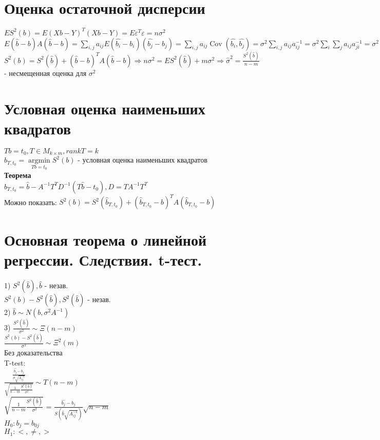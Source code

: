 \documentclass{article}
\newcommand\0{\mathbb{0}}
\DeclareMathOperator{\Cov}{Cov}
\DeclareMathOperator{\argmin}{argmin}
\newcommand\1{\mathbb{1}}
\renewcommand{\bf}{\textbf}
\newcommand{\Rto}{\Rightarrow}
\begin{document}
\section{Оценка остаточной дисперсии}
$ES^2(b) = E(Xb - Y)^T(Xb - Y) = E\varepsilon^T\varepsilon = n\sigma^2$\\
$E(\widehat{b} - b)A(\widehat{b} - b) = \displaystyle\sum_{i, j}a_{ij}E(\widehat{b_i} - b_i)(\widehat{b_j} - b_j) = \displaystyle\sum_{i, j}a_{ij}\Cov(\widehat{b_i}, \widehat{b_j}) = \sigma^2 \displaystyle\sum_{i, j}a_{ij}a_{ij}^{-1} = \sigma^2 \displaystyle\sum_{i} \displaystyle\sum_{j}a_{ij}a_{ji}^{-1} = \sigma^2 \displaystyle\sum_{i = 1}^m 1 = \sigma^2 m$\\
$S^2(b) = S^2(\widehat{b}) + (\widehat{b} - b)^TA(\widehat{b} - b) \Rto n\sigma^2 = ES^2(\widehat{b}) + m\sigma^2 \Rto \widehat{\sigma}^2 = \frac{S^2(\widehat{b})}{n - m}$ - несмещенная оценка для $\sigma^2$\\
\section{Условная оценка наименьших квадратов}
$Tb = t_0, T \in M_{k \times m}, rank T = k$\\
$\widehat{b}_{T, t_0} = \underset{Tb = t_0}{\argmin} S^2(b)$ - условная оценка наименьших квадратов\\
\bf{Теорема}\\
$\widehat{b}_{T, t_0} = \widehat{b} - A^{-1}T^TD^{-1}(T\widehat{b} - t_0), D = TA^{-1}T^T$\\
Можно показать: $S^2(b) = S^2(\widehat{b}_{T, t_0}) + (\widehat{b}_{T, t_0} - b)^TA(\widehat{b}_{T, t_0} - b)$\\
\section{Основная теорема о линейной регрессии. Следствия. t-тест.}
1) $S^2(\widehat{b}), \widehat{b}$ - незав.\\
$S^2(b) - S^2(\widehat{b}), S^2(\widehat{b})$ - незав.\\
2) $\widehat{b} \sim N(b, \sigma^2A^{-1})$\\
3) $\frac{S^2(\widehat{b})}{\sigma^2} \sim \Xi(n - m)$\\
$\frac{S^2(b) - S^2(\widehat{b})}{\sigma^2} \sim \Xi^2(m)$\\
Без доказательства\\
T-test:\\
$\frac{\frac{\widehat{b_j} - b_j}{\sigma\sqrt{A^{-1}_{ij}}}}{\sqrt{\frac{1}{n - m} \frac{S^2(\widehat{b})}{\sigma^2}}} \sim T(n - m)$\\
$\sqrt{\frac{1}{n - m} \frac{S^2(\widehat{b})}{\sigma^2}}$ = $\frac{\widehat{b_j} - b_j}{S(\widehat{b}\sqrt{A^{-1}_{ij}})}\sqrt{n - m}$\\
$H_0: b_j = b_{0j}$\\
$H_1: <, \neq, >$\\
\end{document}
